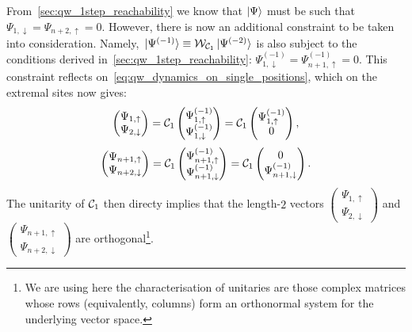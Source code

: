 From~\cref{sec:qw_1step_reachability} we know that $\ket\Psi$ must be such that
$\Psi_{1,\downarrow}=\Psi_{n+2,\uparrow}=0$.
However, there is now an additional constraint to be taken into consideration. Namely, $\ket*{\Psi^{(-1)}}\equiv{\mathcal{W}}_{{\mathcal{C}}_1}\ket*{\Psi^{(-2)}}$ is also subject to the conditions derived in~\cref{sec:qw_1step_reachability}:
$\Psi^{(-1)}_{1,\downarrow}=\Psi^{(-1)}_{n+1,\uparrow}=0$.
This constraint reflects on~\cref{eq:qw_dynamics_on_single_positions}, which on the extremal sites now gives:
\begin{equation}
    \begin{pmatrix}
        \Psi_{1,\uparrow} \\
        \Psi_{2,\downarrow}
    \end{pmatrix} =
    {\mathcal{C}}_1
    \begin{pmatrix}
        \Psi^{(-1)}_{1,\uparrow} \\
        \Psi^{(-1)}_{1,\downarrow}
    \end{pmatrix} =
    {\mathcal{C}}_1
    \begin{pmatrix}
        \Psi^{(-1)}_{1,\uparrow} \\ 0
    \end{pmatrix},
\end{equation}
\begin{equation}
    \begin{pmatrix}
        \Psi_{n+1,\uparrow} \\
        \Psi_{n+2,\downarrow}
    \end{pmatrix} =
    {\mathcal{C}}_1
    \begin{pmatrix}
        \Psi^{(-1)}_{n+1,\uparrow} \\
        \Psi^{(-1)}_{n+1,\downarrow}
    \end{pmatrix} =
    {\mathcal{C}}_1
    \begin{pmatrix}
        0 \\
        \Psi^{(-1)}_{n+1,\downarrow}
    \end{pmatrix}.
\end{equation}
The unitarity of ${\mathcal{C}}_1$ then directy implies that the length-$2$ vectors
$\begin{pmatrix}
    \Psi_{1,\uparrow} \\
    \Psi_{2,\downarrow}
\end{pmatrix}$
and
$\begin{pmatrix}
    \Psi_{n+1,\uparrow} \\
    \Psi_{n+2,\downarrow}
\end{pmatrix}$
are orthogonal\footnote{We are using here the characterisation of unitaries are those complex matrices whose rows (equivalently, columns) form an orthonormal system for the underlying vector space.}.
